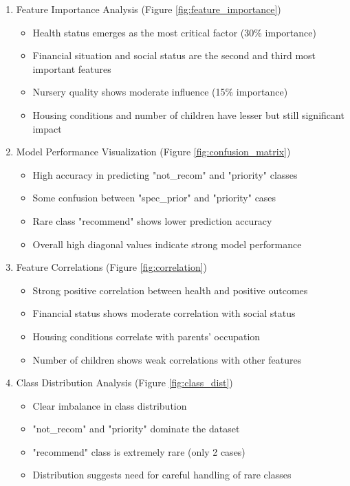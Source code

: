 \begin{enumerate}
    \item Feature Importance Analysis (Figure \ref{fig:feature_importance})
    \begin{itemize}
        \item Health status emerges as the most critical factor (30\% importance)
        \item Financial situation and social status are the second and third most important features
        \item Nursery quality shows moderate influence (15\% importance)
        \item Housing conditions and number of children have lesser but still significant impact
    \end{itemize}
    
    \item Model Performance Visualization (Figure \ref{fig:confusion_matrix})
    \begin{itemize}
        \item High accuracy in predicting "not\_recom" and "priority" classes
        \item Some confusion between "spec\_prior" and "priority" cases
        \item Rare class "recommend" shows lower prediction accuracy
        \item Overall high diagonal values indicate strong model performance
    \end{itemize}
    
    \item Feature Correlations (Figure \ref{fig:correlation})
    \begin{itemize}
        \item Strong positive correlation between health and positive outcomes
        \item Financial status shows moderate correlation with social status
        \item Housing conditions correlate with parents' occupation
        \item Number of children shows weak correlations with other features
    \end{itemize}
    
    \item Class Distribution Analysis (Figure \ref{fig:class_dist})
    \begin{itemize}
        \item Clear imbalance in class distribution
        \item "not\_recom" and "priority" dominate the dataset
        \item "recommend" class is extremely rare (only 2 cases)
        \item Distribution suggests need for careful handling of rare classes
    \end{itemize}
    

\end{enumerate}
